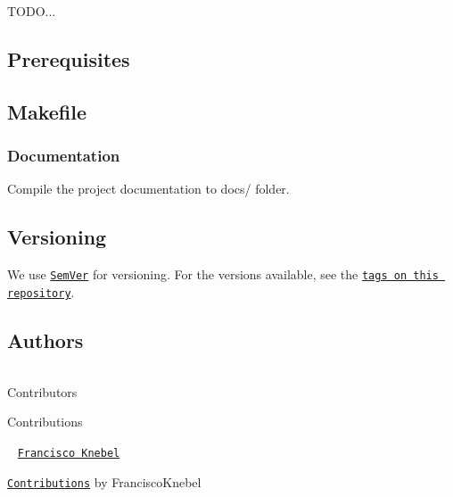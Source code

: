 T\+O\+DO...

\subsection*{Prerequisites}



\subsection*{Makefile}

\subsubsection*{Documentation}

Compile the project documentation to {\ttfamily docs/} folder. 


\subsection*{Versioning}

We use \href{http://semver.org/}{\tt Sem\+Ver} for versioning. For the versions available, see the \href{https://github.com/FranciscoKnebel/syncBox/tags}{\tt tags on this repository}.

\subsection*{Authors}

\tabulinesep=1mm
\begin{longtabu} spread 0pt [c]{*{0}{|X[-1]}|}
\hline
\end{longtabu}
Contributors 

Contributions 

 ~\newline
 \href{https://github.com/FranciscoKnebel}{\tt Francisco Knebel}  

\href{https://github.com/FranciscoKnebel/syncBox/commits?author=FranciscoKnebel}{\tt Contributions} by Francisco\+Knebel   

